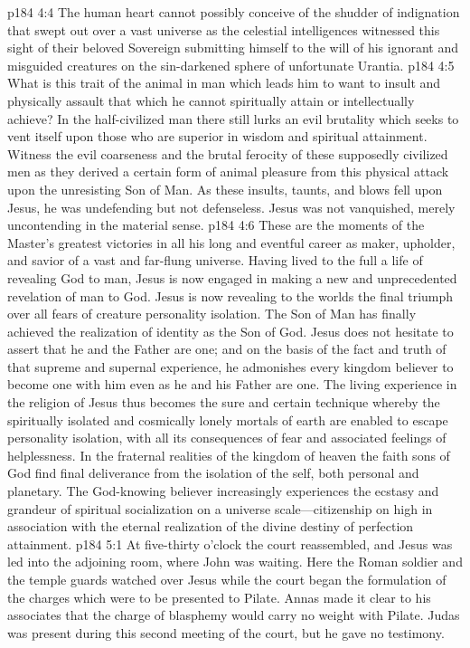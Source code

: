 \pc \vs p184 4:4 The human heart cannot possibly conceive of the shudder of indignation that swept out over a vast universe as the celestial intelligences witnessed this sight of their beloved Sovereign submitting himself to the will of his ignorant and misguided creatures on the sin\hyp{}darkened sphere of unfortunate Urantia.
\vs p184 4:5 What is this trait of the animal in man which leads him to want to insult and physically assault that which he cannot spiritually attain or intellectually achieve? In the half\hyp{}civilized man there still lurks an evil brutality which seeks to vent itself upon those who are superior in wisdom and spiritual attainment. Witness the evil coarseness and the brutal ferocity of these supposedly civilized men as they derived a certain form of animal pleasure from this physical attack upon the unresisting Son of Man. As these insults, taunts, and blows fell upon Jesus, he was undefending but not defenseless. Jesus was not vanquished, merely uncontending in the material sense.
\vs p184 4:6 These are the moments of the Master’s greatest victories in all his long and eventful career as maker, upholder, and savior of a vast and far\hyp{}flung universe. Having lived to the full a life of revealing God to man, Jesus is now engaged in making a new and unprecedented revelation of man to God. Jesus is now revealing to the worlds the final triumph over all fears of creature personality isolation. The Son of Man has finally achieved the realization of identity as the Son of God. Jesus does not hesitate to assert that he and the Father are one; and on the basis of the fact and truth of that supreme and supernal experience, he admonishes every kingdom believer to become one with him even as he and his Father are one. The living experience in the religion of Jesus thus becomes the sure and certain technique whereby the spiritually isolated and cosmically lonely mortals of earth are enabled to escape personality isolation, with all its consequences of fear and associated feelings of helplessness. In the fraternal realities of the kingdom of heaven the faith sons of God find final deliverance from the isolation of the self, both personal and planetary. The God\hyp{}knowing believer increasingly experiences the ecstasy and grandeur of spiritual socialization on a universe scale---citizenship on high in association with the eternal realization of the divine destiny of perfection attainment.
\vs p184 5:1 At five\hyp{}thirty o’clock the court reassembled, and Jesus was led into the adjoining room, where John was waiting. Here the Roman soldier and the temple guards watched over Jesus while the court began the formulation of the charges which were to be presented to Pilate. Annas made it clear to his associates that the charge of blasphemy would carry no weight with Pilate. Judas was present during this second meeting of the court, but he gave no testimony.
